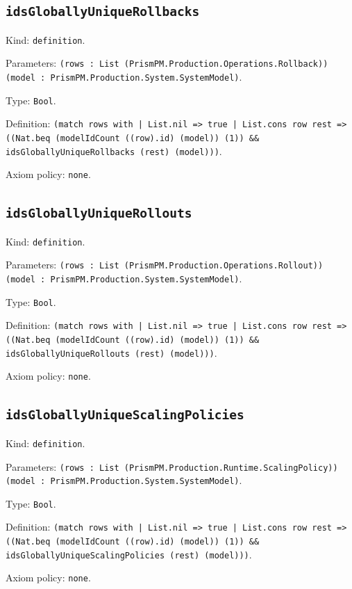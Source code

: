 \documentclass[11pt]{article}
\begin{document}
\subsection*{\texttt{idsGloballyUniqueRollbacks}}
\noindent Kind: \texttt{definition}.\par
\noindent Parameters: \texttt{(rows : List (PrismPM.Production.Operations.Rollback)) (model : PrismPM.Production.System.SystemModel)}.\par
\noindent Type: \texttt{Bool}.\par
\noindent Definition: \texttt{(match rows with | List.nil => true | List.cons row rest => ((Nat.beq (modelIdCount ((row).id) (model)) (1)) \&\& idsGloballyUniqueRollbacks (rest) (model)))}.\par
\noindent Axiom policy: \texttt{none}.\par
\subsection*{\texttt{idsGloballyUniqueRollouts}}
\noindent Kind: \texttt{definition}.\par
\noindent Parameters: \texttt{(rows : List (PrismPM.Production.Operations.Rollout)) (model : PrismPM.Production.System.SystemModel)}.\par
\noindent Type: \texttt{Bool}.\par
\noindent Definition: \texttt{(match rows with | List.nil => true | List.cons row rest => ((Nat.beq (modelIdCount ((row).id) (model)) (1)) \&\& idsGloballyUniqueRollouts (rest) (model)))}.\par
\noindent Axiom policy: \texttt{none}.\par
\subsection*{\texttt{idsGloballyUniqueScalingPolicies}}
\noindent Kind: \texttt{definition}.\par
\noindent Parameters: \texttt{(rows : List (PrismPM.Production.Runtime.ScalingPolicy)) (model : PrismPM.Production.System.SystemModel)}.\par
\noindent Type: \texttt{Bool}.\par
\noindent Definition: \texttt{(match rows with | List.nil => true | List.cons row rest => ((Nat.beq (modelIdCount ((row).id) (model)) (1)) \&\& idsGloballyUniqueScalingPolicies (rest) (model)))}.\par
\noindent Axiom policy: \texttt{none}.\par
\end{document}
